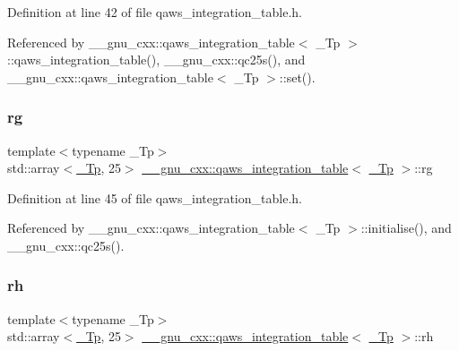 Definition at line 42 of file qaws\+\_\+integration\+\_\+table.\+h.



Referenced by \+\_\+\+\_\+gnu\+\_\+cxx\+::qaws\+\_\+integration\+\_\+table$<$ \+\_\+\+Tp $>$\+::qaws\+\_\+integration\+\_\+table(), \+\_\+\+\_\+gnu\+\_\+cxx\+::qc25s(), and \+\_\+\+\_\+gnu\+\_\+cxx\+::qaws\+\_\+integration\+\_\+table$<$ \+\_\+\+Tp $>$\+::set().

\mbox{\label{struct____gnu__cxx_1_1qaws__integration__table_a6549e81e45d5c4196301c945f707f221}} 
\subsubsection{\texorpdfstring{rg}{rg}}
{\footnotesize\ttfamily template$<$typename \+\_\+\+Tp$>$ \\
std\+::array$<$\hyperlink{namespace____gnu__cxx_a3b19a9c800ca194374ef9172290f7d79}{\+\_\+\+Tp}, 25$>$ \hyperlink{struct____gnu__cxx_1_1qaws__integration__table}{\+\_\+\+\_\+gnu\+\_\+cxx\+::qaws\+\_\+integration\+\_\+table}$<$ \hyperlink{namespace____gnu__cxx_a3b19a9c800ca194374ef9172290f7d79}{\+\_\+\+Tp} $>$\+::rg}



Definition at line 45 of file qaws\+\_\+integration\+\_\+table.\+h.



Referenced by \+\_\+\+\_\+gnu\+\_\+cxx\+::qaws\+\_\+integration\+\_\+table$<$ \+\_\+\+Tp $>$\+::initialise(), and \+\_\+\+\_\+gnu\+\_\+cxx\+::qc25s().

\mbox{\label{struct____gnu__cxx_1_1qaws__integration__table_a7b954bd038be5e62ade0abf9283e90af}} 
\subsubsection{\texorpdfstring{rh}{rh}}
{\footnotesize\ttfamily template$<$typename \+\_\+\+Tp$>$ \\
std\+::array$<$\hyperlink{namespace____gnu__cxx_a3b19a9c800ca194374ef9172290f7d79}{\+\_\+\+Tp}, 25$>$ \hyperlink{struct____gnu__cxx_1_1qaws__integration__table}{\+\_\+\+\_\+gnu\+\_\+cxx\+::qaws\+\_\+integration\+\_\+table}$<$ \hyperlink{namespace____gnu__cxx_a3b19a9c800ca194374ef9172290f7d79}{\+\_\+\+Tp} $>$\+::rh}



